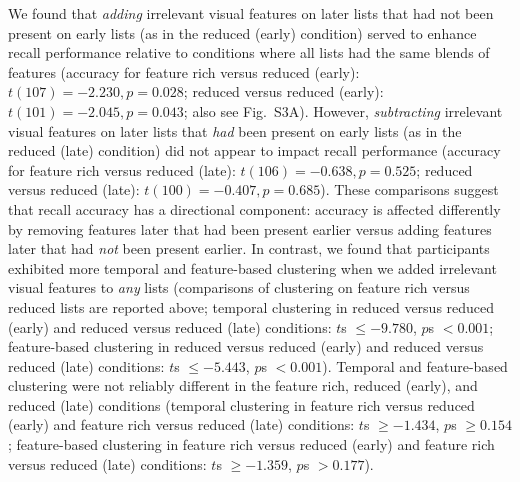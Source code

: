 \documentclass[11pt]{article}
\newcommand{\accuracyByList}{S3}
\begin{document}
We found that \textit{adding} irrelevant visual features on later lists that
had not been present on early lists (as in the reduced (early) condition)
served to enhance recall performance relative to conditions where all lists had
the same blends of features (accuracy for feature rich versus reduced (early):
$t(107) = -2.230, p = 0.028$; reduced versus reduced (early): $t(101) = -2.045,
p = 0.043$; also see Fig.~\accuracyByList A). However, \textit{subtracting}
irrelevant visual features on later lists that \textit{had} been present on
early lists (as in the reduced (late) condition) did not appear to impact
recall performance (accuracy for feature rich versus reduced (late): $t(106) =
-0.638, p = 0.525$; reduced versus reduced (late): $t(100) = -0.407, p =
0.685$). These comparisons suggest that recall accuracy has a directional
component: accuracy is affected differently by removing features later
that had been present earlier versus adding features later that had
\textit{not} been present earlier. In contrast, we found that participants
exhibited more temporal and feature-based clustering when we added irrelevant
visual features to \textit{any} lists (comparisons of clustering on feature
rich versus reduced lists are reported above; temporal clustering in reduced
versus reduced (early) and reduced versus reduced (late) conditions: $t$s $\leq
-9.780$, $p$s $< 0.001$; feature-based clustering in reduced versus reduced
(early) and reduced versus reduced (late) conditions: $t$s $\leq -5.443$, $p$s
$< 0.001$). Temporal and feature-based clustering were not reliably different
in the feature rich, reduced (early), and reduced (late) conditions (temporal
clustering in feature rich versus reduced (early) and feature rich versus
reduced (late) conditions: $t$s $\geq -1.434$, $p$s $\geq 0.154$; feature-based
clustering in feature rich versus reduced (early) and feature rich versus
reduced (late) conditions: $t$s $\geq -1.359$, $p$s $> 0.177$).
\end{document}
